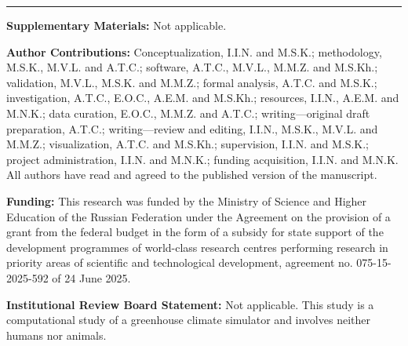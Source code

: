 \vspace{1\baselineskip}
\noindent\rule{\textwidth}{0.4pt}
\small

\noindent\textbf{Supplementary Materials:} Not applicable.

\noindent\textbf{Author Contributions:} Conceptualization, I.I.N. and M.S.K.; methodology, M.S.K., M.V.L. and A.T.C.; software, A.T.C., M.V.L., M.M.Z. and M.S.Kh.; validation, M.V.L., M.S.K. and M.M.Z.; formal analysis, A.T.C. and M.S.K.; investigation, A.T.C., E.O.C., A.E.M. and M.S.Kh.; resources, I.I.N., A.E.M. and M.N.K.; data curation, E.O.C., M.M.Z. and A.T.C.; writing---original draft preparation, A.T.C.; writing---review and editing, I.I.N., M.S.K., M.V.L. and M.M.Z.; visualization, A.T.C. and M.S.Kh.; supervision, I.I.N. and M.S.K.; project administration, I.I.N. and M.N.K.; funding acquisition, I.I.N. and M.N.K. All authors have read and agreed to the published version of the manuscript.

\noindent\textbf{Funding:} This research was funded by the Ministry of Science and Higher Education of the Russian Federation under the Agreement on the provision of a grant from the federal budget in the form of a subsidy for state support of the development programmes of world-class research centres performing research in priority areas of scientific and technological development, agreement no. 075-15-2025-592 of 24 June 2025.

\noindent\textbf{Institutional Review Board Statement:} Not applicable. This
study is a computational study of a greenhouse climate simulator and involves
neither humans nor animals.

